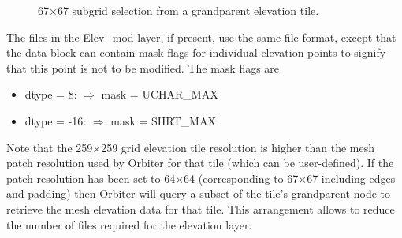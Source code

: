 \documentclass[Orbiter Developer Manual.tex]{subfiles}
\begin{document}
\begin{figure}[H]
	\centering
	\caption{67×67 subgrid selection from a grandparent elevation tile.}
\end{figure}

\noindent
The files in the Elev\_mod layer, if present, use the same file format, except that the data block can contain mask flags for individual elevation points to signify that this point is not to be modified. The mask flags are

\begin{itemize}
\item dtype = 8: $\Rightarrow$ mask = UCHAR\_MAX
\item dtype = -16: $\Rightarrow$ mask = SHRT\_MAX
\end{itemize}

\noindent
Note that the 259×259 grid elevation tile resolution is higher than the mesh patch resolution used by Orbiter for that tile (which can be user-defined). If the patch resolution has been set to 64×64 (corresponding to 67×67 including edges and padding) then Orbiter will query a subset of the tile's grandparent node to retrieve the mesh elevation data for that tile. This arrangement allows to reduce the number of files required for the elevation layer.
\end{document}

